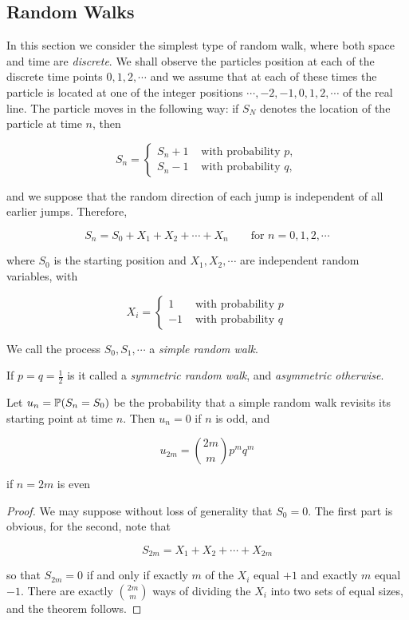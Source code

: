 \documentclass[a4paper]{article}
\begin{document}
\subsection{Random Walks}

In this section we consider the simplest type of random walk, where both space and time are \emph{discrete}. We shall observe the particles position at each of the discrete time points $ 0,1,2,\cdots$ and we assume that at each of these times the particle is located at one of the integer positions $ \cdots,-2,-1,0,1,2,\cdots $ of the real line. The particle moves in the following way: if $ S_{N} $ denotes the location of the particle at time $ n $, then

\[ S_{n} = \begin{cases} S_{n} + 1  & \text{ with probability } p, \\ S_{n} - 1 & \text{ with probability } q, \end{cases} \]

and we suppose that the random direction of each jump is independent of all earlier jumps. Therefore,

\[ S_{n} = S_{0} + X_{1} + X_{2} + \cdots + X_{n} \qquad \text{for } n = 0,1,2,\cdots \]

where $ S_{0} $ is the starting position and $ X_{1} ,X_{2},\cdots$ are independent random variables, with

\[ X_{i} = \begin{cases} 1  & \text{ with probability } p \\ -1 & \text{ with probability } q \end{cases} \]

We call the process $ S_{0},S_{1},\cdots $ a \emph{simple random walk}.

\begin{defi}
	If $ p = q = \frac{1}{2} $ is it called a \emph{symmetric random walk}, and \emph{asymmetric otherwise}.
\end{defi}


\begin{thm} 
	Let $ u_{n} = \P(S_{n} = S_{0}) $ be the probability that a simple random walk revisits its starting point at time $ n $. Then $ u_{n} = 0 $ if $ n $ is odd, and 
	
	\[ u_{2m} = \binom{2m}{m} p^{m} q^{m} \]
	
	if $ n = 2m $ is even
	
\end{thm}

\begin{proof}
	We may suppose without loss of generality that $ S_{0} = 0 $. The first part is obvious, for the second, note that
	
	\[ S_{2m} = X_{1} + X_{2} + \cdots + X_{2m} \]
	
	so that $ S_{2m} = 0 $ if and only if exactly $ m $ of the $ X_{i} $ equal $ +1 $ and exactly $ m $ equal $ -1 $. There are exactly $ \binom{2m}{m} $ ways of dividing the $ X_{i} $ into two sets of equal sizes, and the theorem follows.
\end{proof}
\end{document}
